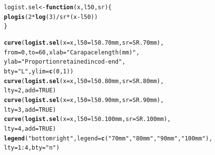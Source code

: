 \documentclass[12pt]{article}\usepackage[]{graphicx}\usepackage[]{color}
\makeatletter
\newcommand{\hlnum}[1]{\textcolor[rgb]{0.686,0.059,0.569}{#1}}%
\newcommand{\hlstr}[1]{\textcolor[rgb]{0.192,0.494,0.8}{#1}}%
\newcommand{\hlopt}[1]{\textcolor[rgb]{0,0,0}{#1}}%
\newcommand{\hlstd}[1]{\textcolor[rgb]{0.345,0.345,0.345}{#1}}%
\newcommand{\hlkwa}[1]{\textcolor[rgb]{0.161,0.373,0.58}{\textbf{#1}}}%
\newcommand{\hlkwb}[1]{\textcolor[rgb]{0.69,0.353,0.396}{#1}}%
\newcommand{\hlkwc}[1]{\textcolor[rgb]{0.333,0.667,0.333}{#1}}%
\newcommand{\hlkwd}[1]{\textcolor[rgb]{0.737,0.353,0.396}{\textbf{#1}}}%
\newenvironment{kframe}{%
 \def\at@end@of@kframe{}%
 \ifinner\ifhmode%
  \def\at@end@of@kframe{\end{minipage}}%
  \begin{minipage}{\columnwidth}%
 \fi\fi%
 \def\FrameCommand##1{\hskip\@totalleftmargin \hskip-\fboxsep
 \colorbox{shadecolor}{##1}\hskip-\fboxsep
     \hskip-\linewidth \hskip-\@totalleftmargin \hskip\columnwidth}%
 \MakeFramed {\advance\hsize-\width
   \@totalleftmargin\z@ \linewidth\hsize
   \@setminipage}}%
 {\par\unskip\endMakeFramed%
 \at@end@of@kframe}
\newenvironment{knitrout}{}{} %
\makeatother
\begin{document}
\begin{knitrout}\footnotesize
{}\color{fgcolor}\begin{kframe}
\begin{alltt}
\hlstd{logist.sel} \hlkwb{<-} \hlkwa{function}\hlstd{(}\hlkwc{x}\hlstd{,} \hlkwc{l50}\hlstd{,} \hlkwc{sr}\hlstd{)\{}
  \hlkwd{plogis}\hlstd{(}\hlnum{2} \hlopt{*} \hlkwd{log}\hlstd{(}\hlnum{3}\hlstd{)} \hlopt{/} \hlstd{sr} \hlopt{*} \hlstd{(x} \hlopt{-} \hlstd{l50))}
\hlstd{\}}

\hlkwd{curve}\hlstd{(}\hlkwd{logist.sel}\hlstd{(}\hlkwc{x} \hlstd{= x,} \hlkwc{l50} \hlstd{= l50.70mm,} \hlkwc{sr} \hlstd{= SR.70mm),}
      \hlkwc{from} \hlstd{=} \hlnum{0}\hlstd{,} \hlkwc{to} \hlstd{=} \hlnum{60}\hlstd{,} \hlkwc{xlab} \hlstd{=} \hlstr{"Carapace length (mm)"}\hlstd{,}
      \hlkwc{ylab} \hlstd{=} \hlstr{"Proportion retained in cod-end"}\hlstd{,}
      \hlkwc{bty} \hlstd{=} \hlstr{"L"}\hlstd{,} \hlkwc{ylim} \hlstd{=} \hlkwd{c}\hlstd{(}\hlnum{0}\hlstd{,} \hlnum{1}\hlstd{))}
\hlkwd{curve}\hlstd{(}\hlkwd{logist.sel}\hlstd{(}\hlkwc{x} \hlstd{= x,} \hlkwc{l50} \hlstd{= l50.80mm,} \hlkwc{sr} \hlstd{= SR.80mm),}
      \hlkwc{lty} \hlstd{=} \hlnum{2}\hlstd{,} \hlkwc{add} \hlstd{=} \hlnum{TRUE}\hlstd{)}
\hlkwd{curve}\hlstd{(}\hlkwd{logist.sel}\hlstd{(}\hlkwc{x} \hlstd{= x,} \hlkwc{l50} \hlstd{= l50.90mm,} \hlkwc{sr} \hlstd{= SR.90mm),}
      \hlkwc{lty} \hlstd{=} \hlnum{3}\hlstd{,} \hlkwc{add} \hlstd{=} \hlnum{TRUE}\hlstd{)}
\hlkwd{curve}\hlstd{(}\hlkwd{logist.sel}\hlstd{(}\hlkwc{x} \hlstd{= x,} \hlkwc{l50} \hlstd{= l50.100mm,} \hlkwc{sr} \hlstd{= SR.100mm),}
      \hlkwc{lty} \hlstd{=} \hlnum{4}\hlstd{,} \hlkwc{add} \hlstd{=} \hlnum{TRUE}\hlstd{)}
\hlkwd{legend}\hlstd{(}\hlstr{"bottomright"}\hlstd{,} \hlkwc{legend} \hlstd{=} \hlkwd{c}\hlstd{(}\hlstr{"70mm"}\hlstd{,} \hlstr{"80mm"}\hlstd{,} \hlstr{"90mm"}\hlstd{,} \hlstr{"100mm"}\hlstd{),}
       \hlkwc{lty} \hlstd{=} \hlnum{1}\hlopt{:}\hlnum{4}\hlstd{,} \hlkwc{bty} \hlstd{=} \hlstr{"n"}\hlstd{)}
\end{alltt}
\end{kframe}\begin{figure}


\end{figure}
\end{knitrout}
\end{document}
